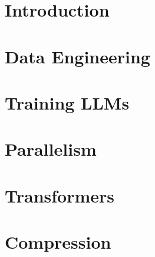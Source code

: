 \documentclass[oneside, a4paper,11pt]{book}
\begin{document}
\mainmatter
\part{Introduction}


\part{Data Engineering}

\part{Training LLMs}

\part{Parallelism}

\part{Transformers}

\part{Compression}


\backmatter

\nocite{*}


\end{document}
